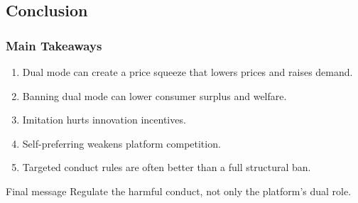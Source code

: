 \documentclass[aspectratio=169,AutoFakeBold,AutoFakeSlant]{beamer}
\begin{document}
\subsection{Conclusion}

\begin{frame}
  \frametitle{Main Takeaways}
  \small
  \begin{enumerate}
    \item Dual mode can create a price squeeze that lowers prices and raises demand.
    \item Banning dual mode can lower consumer surplus and welfare.
    \item Imitation hurts innovation incentives.
    \item Self-preferring weakens platform competition.
    \item Targeted conduct rules are often better than a full structural ban.
  \end{enumerate}

  \begin{alertblock}{Final message}
    Regulate the harmful conduct, not only the platform's dual role.
  \end{alertblock}
\end{frame}
\end{document}
